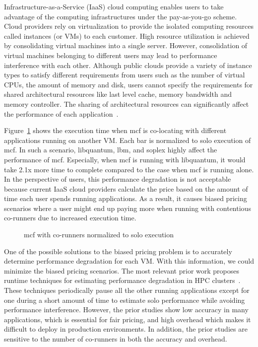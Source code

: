 \documentclass{sig-alternate}
\begin{document}
Infrastructure-as-a-Service (IaaS) cloud computing enables users to take advantage of the computing infrastructures under the pay-as-you-go scheme. Cloud providers rely on virtualization to provide the isolated computing resources called instances (or VMs) to each customer. High resource utilization is achieved by consolidating virtual machines into a single server. However, consolidation of virtual machines belonging to different users may lead to performance interference with each other. Although public clouds provide a variety of instance types to satisfy different requirements from users such as the number of virtual CPUs, the amount of memory and disk, users cannot specify the requirements for shared architectural resources like last level cache, memory bandwidth and memory controller. The sharing of architectural resources can significantly affect the performance of each application~\cite{Nathuji:2010:QMP:1755913.1755938,Govindan:2011:CQE:2038916.2038938,Ahn:2012:DVM:2342763.2342782,Varadarajan:2012:RAI:2382196.2382228,Vasic:2012:DAR:2248487.2151021,Novakovic:2013:DTI:2535461.2535489,Ma:2015:SDS:2694344.2694382,Liu:2014:OVM:2665671.2665720, 6522328}.

Figure~\ref{fig:comparecorun} shows the execution time when mcf is co-locating with different applications running on another VM. Each bar is normalized to solo execution of mcf. In such a scenario, libquantum, lbm, and soplex highly affect the performance of mcf. Especially, when mcf is running with libquantum, it would take 2.1x more time to complete compared to the case when mcf is running alone. 
In the perspective of users, this performance degradation is not acceptable because current IaaS cloud providers calculate the price based on the amount of time each user spends running applications. As a result, it causes biased pricing scenarios where a user might end up paying more when running with contentious co-runners due to increased execution time.
\begin{figure}
\centering
\begin{minipage}[t]{1\columnwidth}
\centering
{}
\caption{mcf with co-runners normalized to solo execution\vspace{-0.3in}}
\label{fig:comparecorun}
\end{minipage}
\end{figure}

One of the possible solutions to the biased pricing problem is to accurately determine performance degradation for each VM. With this information, we could minimize the biased pricing scenarios. The most relevant prior work proposes runtime techniques for estimating performance degradation in HPC clusters~\cite{fairpricing, 6844481}. These techniques periodically pause all the other running applications except for one during a short amount of time to estimate solo performance while avoiding performance interference. However, the prior studies show low accuracy in many applications, which is essential for fair pricing, and high overhead which makes it difficult to deploy in production environments. In addition, the prior studies are sensitive to the number of co-runners in both the accuracy and overhead.
\end{document}
